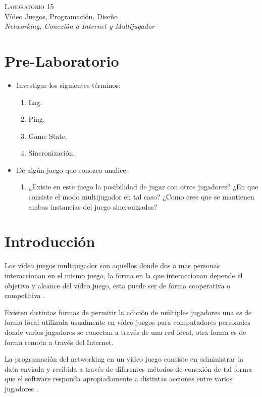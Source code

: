 \begin{center}
\textsc{\Large Laboratorio 15}~\\
{\large Vídeo Juegos, Programación, Diseño}~\\
\emph{Networking, Conexión a Internet y Multijugador}
\end{center}

\section{Pre-Laboratorio}
\begin{itemize}
\item Investigar los siguientes términos:
\begin{enumerate}
  \item Lag.
  \item Ping.
  \item Game State.
  \item Sincronización.
\end{enumerate}
\item De algún juego que conozca analice.
\begin{enumerate}
  \item ¿Existe en este juego la posibilidad de jugar con otros jugadores? ¿En que consiste el modo multijugador en tal caso? ¿Como cree que se mantienen ambas instancias del juego sincronizadas? 
\end{enumerate}
\end{itemize}

\section{Introducción}
Los vídeo juegos multijugador son aquellos donde dos a mas personas interaccionan en el mismo juego, la forma en la que interaccionan depende el objetivo y alcance del vídeo juego, esta puede ser de forma cooperativa o competitiva \cite{valve_networking}.

Existen distintas formas de permitir la adición de múltiples jugadores una es de forma local utilizada usualmente en vídeo juegos para computadores personales donde varios jugadores se conectan a través de una red local, otra forma es de forma remota a través del Internet.

La programación del networking en un vídeo juego consiste en administrar la data enviada y recibida a través de diferentes métodos de conexión de tal forma que el software responda apropiadamente a distintas acciones entre varios jugadores \cite[p.~355]{jenkinscreatinggames}.

